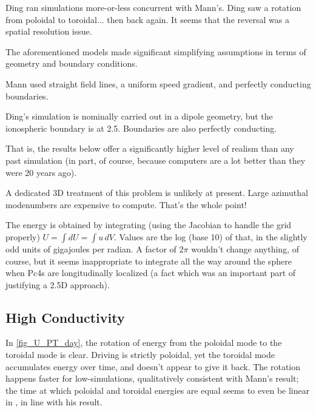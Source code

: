 
Ding\cite{ding_1995} ran simulations more-or-less concurrent with Mann's. Ding saw a rotation from poloidal to toroidal... then back again. It seems that the reversal was a spatial resolution issue. 

The aforementioned models made significant simplifying assumptions in terms of geometry and boundary conditions. 

Mann used straight field lines, a uniform \Alfven speed gradient, and perfectly conducting boundaries. 

Ding's simulation is nominally carried out in a dipole geometry, but the ionospheric boundary is at \SI{2.5}{\RE}. Boundaries are also perfectly conducting. 

That is, the results below offer a significantly higher level of realism than any past simulation (in part, of course, because computers are a lot better than they were 20 years ago). 

A dedicated 3D treatment of this problem is unlikely at present. Large azimuthal modenumbers are expensive to compute. That's the whole point! 

The energy is obtained by integrating (using the Jacobian to handle the grid properly) $U = \int dU = \int u \, dV$. Values are the log (base 10) of that, in the slightly odd units of gigajoules per radian. A factor of $2\pi$ wouldn't change anything, of course, but it seems inappropriate to integrate all the way around the sphere when Pc4s are longitudinally localized (a fact which was an important part of justifying a 2.5D approach). 

\subsection{High Conductivity}

In \cref{fig_U_PT_day}, the rotation of energy from the poloidal mode to the toroidal mode is clear. Driving is strictly poloidal, yet the toroidal mode accumulates energy over time, and doesn't appear to give it back. The rotation happens faster for low-\azm simulations, qualitatively consistent with Mann's result; the time at which poloidal and toroidal energies are equal seems to even be linear in \azm, in line with his result. 

